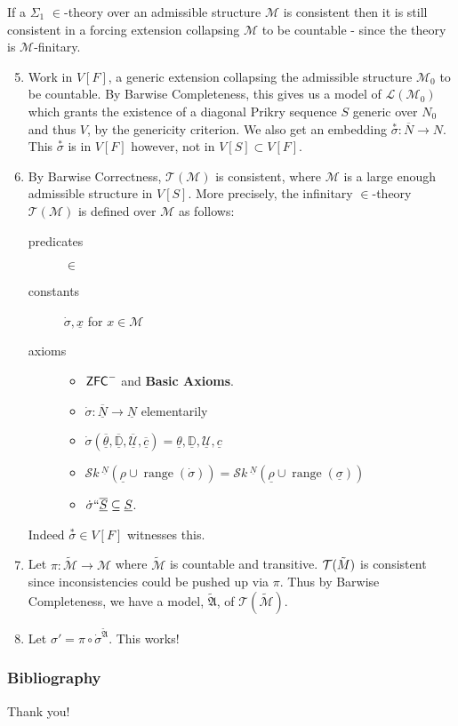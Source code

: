\documentclass[utf8x,xcolor=svgnames,8pt]{beamer}
\newcommand{\M}{\mathcal{M}}
\newcommand{\D}{\mathbb{D}}
\newcommand{\N}{{\overline{N}}}
\renewcommand{\U}{\mathcal{U}}
\newcommand{\ZFC}{\textup{\ensuremath{\textsf{ZFC}}}}
\DeclareMathOperator{\ran}{range}
\newcommand{\To}{\longrightarrow}
\newcommand{\SH}{\mathcal{S}\textit{k} \,}
\newcommand{\sk}[3]{\SH^{#1}( {#2} \cup {\ran(#3)} ) }
\begin{document}
\begin{frame}
If a $\Sigma_1$ $\in$-theory over an admissible structure $\M$ is consistent then it is still consistent in a forcing extension collapsing $\M$ to be countable - since the theory is $\M$-finitary.
\begin{enumerate}\setcounter{enumi}{4}
	\item Work in $V[F]$, a generic extension collapsing the admissible structure $\mathcal M_0$ to be countable. By Barwise Completeness, this gives us a model of $\mathcal L(\M_0)$ which grants the existence of a diagonal Prikry sequence $S$ generic over $N_0$ and thus $V$, by the genericity criterion. We also get an embedding $\overset{*}\sigma: \N \To N$. This $\overset{*}\sigma$ is in $V[F]$ however, not in $V[S]\subset V[F]$.
	\item By Barwise Correctness, $\mathcal T(\mathcal M)$ is consistent, where $\mathcal M$ is a large enough admissible structure in $V[S]$. More precisely, the infinitary $\in$-theory $\mathcal T(\mathcal M)$ is defined over $\mathcal M$ as follows: 
\begin{description}
	\item[predicates] $\in$ 
	\item[constants] $\dot{\sigma}, \underline x$ for $x \in \mathcal M$
	\item[axioms] \begin{itemize} \item $\ZFC^-$ and \textbf{Basic Axioms}.
		\item $\dot \sigma : \overline{\underline N} \To \underline N$ elementarily
		\item $\dot{\sigma}(\overline{\underline{\theta}}, \overline{\underline{\D}}, \overline{\underline{\U}}, \overline{\underline c})=\underline{\theta}, \underline{\D}, \underline{\U}, \underline{c}$
		\item $\sk{\underline N}{\underline \rho}{\dot{\sigma}} = \sk{\underline N}{\underline \rho}{\underline \sigma}$
		\item $\dot \sigma ``\overline{\underline S} \subseteq \underline S$.
	\end{itemize}
\end{description} Indeed $\overset{*}\sigma \in V[F]$ witnesses this. 
	\item Let $\pi: \tilde{\mathcal M} \To \mathcal M$ where $\tilde{\mathcal M}$ is countable and transitive. $\mathcal T(\tilde{\mathcal \M})$ is consistent since inconsistencies could be pushed up via $\pi$. Thus by Barwise Completeness, we have a model, $\tilde{\mathfrak A}$, of $\mathcal T(\tilde{\mathcal M})$.
	\item Let $\sigma' =\pi \circ \dot{\sigma}^{\tilde{\mathfrak A}}$. This works! \qedhere
\end{enumerate}
\end{frame}




\begin{frame}
\frametitle{Bibliography}


\end{frame}

\begin{frame}
\center Thank you!
\end{frame}
\end{document}
